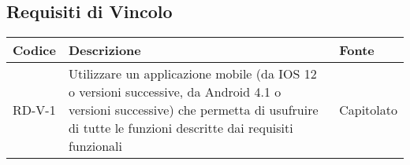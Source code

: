 \subsection{Requisiti di Vincolo}
\begin{center}
\renewcommand{\arraystretch}{1.8} %
\begin{tabular}{ | m{8em} | m{18em} | m{12em} | }
\hline
Codice&Descrizione&Fonte\\
\hline
RD-V-1& Utilizzare un applicazione mobile (da IOS 12 o versioni successive, da Android 4.1 o versioni successive) che permetta di usufruire di tutte le funzioni descritte dai requisiti funzionali&Capitolato\\
\hline
\end{tabular}
\end{center}